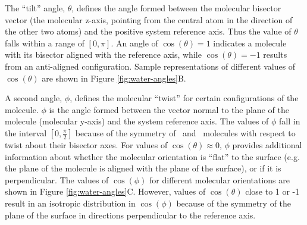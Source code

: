 \documentclass{article}
\begin{document}
	The ``tilt'' angle, $\theta$, defines the angle formed between the molecular bisector vector (the molecular z-axis, pointing from the central atom in the direction of the other two atoms) and the positive system reference axis. Thus the value of $\theta$ falls within a range of $[0,\pi]$. An angle of $\cos(\theta)=1$ indicates a molecule with its bisector aligned with the reference axis, while $\cos(\theta)=-1$ results from an anti-aligned configuration. Sample representations of different values of $\cos(\theta)$ are shown in Figure \ref{fig:water-angles}B.
	
	A second angle, $\phi$, defines the molecular ``twist'' for certain configurations of the molecule. $\phi$ is the angle formed between the vector normal to the plane of the molecule (molecular y-axis) and the system reference axis. The values of $\phi$ fall in the interval $[0,\frac{\pi}{2}]$ because of the symmetry of \wat~and \suldiox~molecules with respect to twist about their bisector axes. For values of $\cos(\theta) \approx 0$, $\phi$ provides additional information about whether the molecular orientation is ``flat'' to the surface (e.g. the plane of the molecule is aligned with the plane of the surface), or if it is perpendicular. The values of $\cos(\phi)$ for different molecular orientations are shown in Figure \ref{fig:water-angles}C. %
	However, values of $\cos(\theta)$ close to 1 or -1 result in an isotropic distribution in $\cos(\phi)$ because of the symmetry of the plane of the surface in directions perpendicular to the reference axis.
\end{document}
